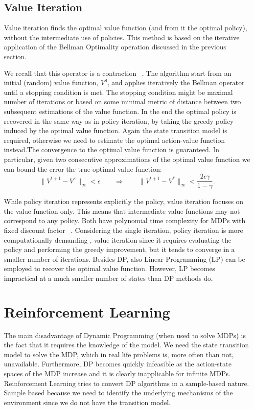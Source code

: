 \subsection{Value Iteration}
Value iteration finds the optimal value function (and from it the optimal policy), without the intermediate use of policies. This method is based on the iterative application of the Bellman Optimality operation discussed in the previous section.\par
We recall that this operator is a contraction ~\cite{Banach1922}. The algorithm start from an initial (random) value function, $V^0$, and applies iteratively the Bellman operator until a stopping condition is met. The stopping condition might be maximal number of iterations or based on some minimal metric of distance between two subsequent estimations of the value function. In the end the optimal policy is recovered in the same way as in policy iteration, by taking the greedy policy induced by the optimal value function. Again the state transition model is required, otherwise we need to estimate the optimal action-value function instead.The convergence to the optimal value function is guaranteed. In particular, given two consecutive
approximations of the optimal value function we can bound the error \wrt the true optimal value function:
\begin{equation}
\|V^{t+1}-V^{s}\|_{\infty} < \epsilon \qquad \Rightarrow \qquad \|V^{t+1}-V^*\|_{\infty} < \frac{2 \epsilon \gamma}{1- \gamma}.
\end{equation} \par
While policy iteration represents explicitly the policy, value iteration focuses on the value function only. This means that intermediate value functions may not correspond to any policy. Both have polynomial time complexity for MDPs with fixed discount factor ~\cite{DBLP:journals/corr/abs-1301-6718}. Considering the single iteration, policy iteration is more computationally demanding \wrt, value iteration since it requires evaluating the policy and performing the greedy improvement, but it tends to converge in a smaller number of iterations. Besides DP, also Linear Programming (LP) can be employed to recover the optimal value function. However, LP becomes impractical at a much smaller number of states than DP methods do.
\section{Reinforcement Learning} \label{reinforcement_learning}
The main disadvantage of Dynamic Programming (when used to solve MDPs) is the fact that it requires the knowledge of the model. We need the state transition model to solve the MDP, which in real life problems is, more often than not, unavailable. Furthermore, DP becomes quickly infeasible as the action-state spaces of the MDP increase and it is clearly inapplicable for infinite MDPs. Reinforcement Learning tries to  convert DP algorithms in a sample-based nature. Sample based because we need to identify the underlying mechanisms of the environment since we do not have the transition model. 
